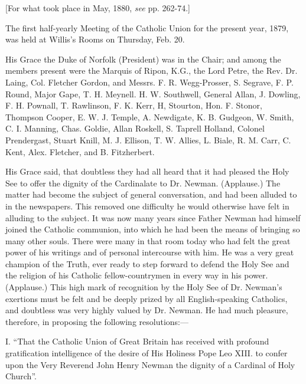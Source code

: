 
[For what took place in May, 1880, \emph{see} pp. 262-74.]


The first half-yearly Meeting of the Catholic Union for the present
year, 1879, was held at Willis's Rooms on Thursday, Feb. 20.

His Grace the Duke of Norfolk (President) was in the Chair; and
among the members present were the Marquis of Ripon, K.G., the Lord
Petre, the Rev. Dr. Laing, Col. Fletcher Gordon, and Messrs. F. R.
Wegg-Prosser, S. Segrave, F. P. Round, Major Gape, T. H. Meynell. H.
W. Southwell, General Allan, J. Dowling, F. H. Pownall, T. Rawlinson,
F. K. Kerr, H, Stourton, Hon. F. Stonor, Thompson Cooper, E. W. J.
Temple, A. Newdigate, K. B. Gudgeon, W. Smith, C. I. Manning, Chas.
Goldie, Allan Roskell, S. Taprell Holland, Colonel Prendergast, Stuart
Knill, M. J. Ellison, T. W. Allies, L. Biale, R. M. Carr, C. Kent,
Alex. Fletcher, and B. Fitzherbert.


His Grace said, that doubtless they had all heard that it had
pleased the Holy See to offer the dignity of the Cardinalate to Dr.
Newman. (Applause.) The matter had become the subject of general
conversation, and had been alluded to in the newspapers. This removed
one difficulty he would otherwise have felt in alluding to the
subject. It was now many years since Father Newman had himself joined
the Catholic communion, into which he had been the means of bringing
so many other souls. There were many in that room today who had felt
the great power of his writings and of personal intercourse with him.
He was a very great champion of the Truth, ever ready to step forward
to defend the Holy See and the religion of his Catholic
fellow-countrymen in every way in his power. (Applause.) This high
mark of recognition by the Holy See of Dr. Newman's exertions must be
felt and be deeply prized by all English-speaking Catholics, and
doubtless was very highly valued by Dr. Newman. He had much pleasure,
therefore, in proposing the following resolutions:—

I. ``That the Catholic Union of Great Britain has received with
profound gratification intelligence of the desire of His Holiness Pope
Leo XIII. to confer upon the Very Reverend John Henry Newman the
dignity of a Cardinal of Holy Church''.

